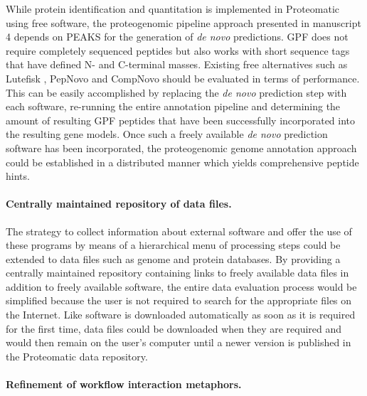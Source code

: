 While protein identification and quantitation is implemented in Proteomatic
using free software, the proteogenomic pipeline approach presented in 
manuscript 4 depends on PEAKS for the generation of {\em de novo} predictions.
GPF does not require completely sequenced peptides but also works with
short sequence tags that have defined N- and C-terminal masses.
Existing free alternatives such as Lutefisk \citep{Johnson2002}, PepNovo 
\citep{Frank2005} and CompNovo \citep{Bertsch2009} should be evaluated in
terms of performance.
This can be easily accomplished by replacing the {\em de novo} prediction
step with each software, re-running the entire annotation pipeline and 
determining the amount of resulting GPF peptides that have been successfully
incorporated into the resulting gene models.
Once such a freely available {\em de novo} prediction software has been
incorporated, the proteogenomic genome annotation approach could be 
established in a distributed manner which yields comprehensive peptide hints.

\paragraph{Centrally maintained repository of data files.}

The strategy to collect information about external software and offer the
use of these programs by means of a hierarchical menu of processing steps
could be extended to data files such as genome and protein databases.
By providing a centrally maintained repository containing links to freely
available data files in addition to freely available software, the entire
data evaluation process would be simplified because the user is not
required to search for the appropriate files on the Internet.
Like software is downloaded automatically as soon as it is required for the 
first time, data files could be downloaded when they are required and would
then remain on the user's computer until a newer version is published in
the Proteomatic data repository.

\paragraph{Refinement of workflow interaction metaphors.}

